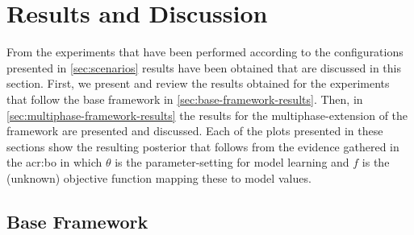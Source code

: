 %
%
%

\section{Results and Discussion}
\label{sec:results}

From the experiments that have been performed according to the configurations presented in \autoref{sec:scenarios} results have been obtained that are discussed in this section.
First, we present and review the results obtained for the experiments that follow the base framework in \autoref{sec:base-framework-results}.
Then, in \autoref{sec:multiphase-framework-results} the results for the multiphase-extension of the framework are presented and discussed. Each of the plots presented in these sections show the resulting posterior that follows from the evidence gathered in the \acrshort{acr:bo} in which $\theta$ is the parameter-setting for model learning and $f$ is the (unknown) objective function mapping these to model values.

\subsection{Base Framework}
\label{sec:base-framework-results}

